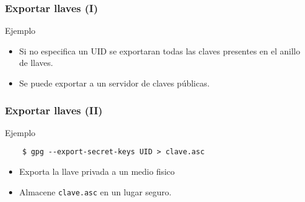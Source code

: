 \documentclass{beamer}
\newenvironment{ejemplo}{\begin{exampleblock}{Ejemplo}}{\end{exampleblock}}
\begin{document}

\begin{frame}[fragile]
    \frametitle{Exportar llaves (I)}

    \begin{ejemplo}
    \begin{semiverbatim}
    \end{semiverbatim}
    \end{ejemplo}

    \begin{itemize}
        \item<1->
        Si no especifica un UID se exportaran todas las claves presentes en el
        anillo de llaves.
        \item<2->
        Se puede exportar a un servidor de claves públicas.
    \end{itemize}
\end{frame} 

\begin{frame}[fragile]
    \frametitle{Exportar llaves (II)}

    \begin{ejemplo}
    \begin{verbatim}
    $ gpg --export-secret-keys UID > clave.asc
    \end{verbatim}
    \end{ejemplo}

    \begin{itemize}[<+->]
        \item
        Exporta la llave privada a un medio fisico
        \item
        Almacene \texttt{clave.asc} en un lugar seguro.
    \end{itemize}
\end{frame}
\end{document}
